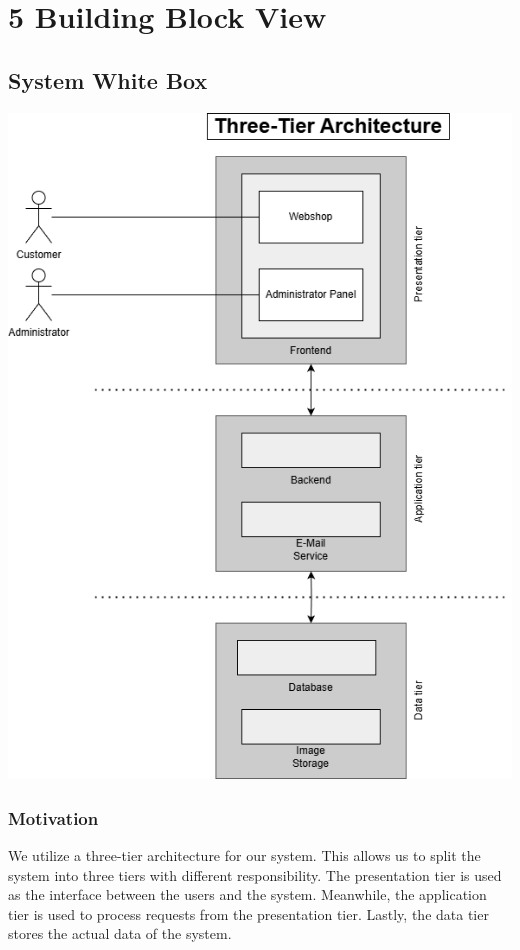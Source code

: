 \hypertarget{section-building-block-view}{%
\section{5 Building Block View}\label{section-building-block-view}}

\subsection{System White Box}
\includegraphics{images/building_block_system_whitebox.png}

\subsubsection{Motivation}
We utilize a three-tier architecture for our system.
This allows us to split the system into three tiers with different responsibility.
The presentation tier is used as the interface between the users and the system.
Meanwhile, the application tier is used to process requests from the presentation tier.
Lastly, the data tier stores the actual data of the system.

